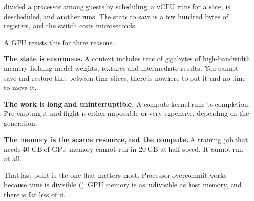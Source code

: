  divided a processor among guests by scheduling: a vCPU runs for
a slice, is descheduled, and another runs. The state to save is a few hundred
bytes of registers, and the switch costs microseconds.

A GPU resists this for three reasons.

\begin{tight}
  \item \textbf{The state is enormous.} A context includes tens of gigabytes of
        high-bandwidth memory holding model weights, textures and intermediate
        results. You cannot save and restore that between time slices; there is
        nowhere to put it and no time to move it.
  \item \textbf{The work is long and uninterruptible.} A compute kernel runs to
        completion. Pre-empting it mid-flight is either impossible or very
        expensive, depending on the generation.
  \item \textbf{The memory is the scarce resource, not the compute.} A training
        job that needs 40 GB of GPU memory cannot run in 20 GB at half speed.
        It cannot run at all.
\end{tight}

That last point is the one that matters most. Processor overcommit works
because time is divisible (); GPU memory is as indivisible as
host memory, and there is far less of it.

